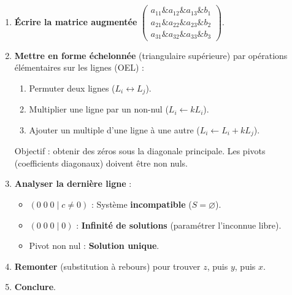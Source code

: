 \documentclass[11pt]{article}
\newcommand{\cle}[1]{{\popxbold\color{popdark}#1}}
\begin{document}
\begin{methode}
\begin{enumerate}
\item \textbf{Écrire la matrice augmentée} $\left( \begin{array}{ccc|c} a_{11} \& a_{12} \& a_{13} \& b_1 \\ a_{21} \& a_{22} \& a_{23} \& b_2 \\ a_{31} \& a_{32} \& a_{33} \& b_3 \end{array} \right)$.
\item \textbf{Mettre en forme échelonnée} (triangulaire supérieure) par \cle{opérations élémentaires sur les lignes (OEL)} :
  \begin{enumerate}
    \item Permuter deux lignes ($L_i \leftrightarrow L_j$).
    \item Multiplier une ligne par un non-nul ($L_i \leftarrow k L_i$).
    \item Ajouter un multiple d'une ligne à une autre ($L_i \leftarrow L_i + k L_j$).
  \end{enumerate}
  Objectif : obtenir des zéros sous la diagonale principale. Les pivots (coefficients diagonaux) doivent être non nuls.
\item \textbf{Analyser la dernière ligne} :
  \begin{itemize}
    \item $(0\;0\;0 \mid c \neq 0)$ : Système \textbf{incompatible} ($S = \varnothing$).
    \item $(0\;0\;0 \mid 0)$ : \textbf{Infinité de solutions} (paramétrer l'inconnue libre).
    \item Pivot non nul : \textbf{Solution unique}.
  \end{itemize}
\item \textbf{Remonter} (substitution à rebours) pour trouver $z$, puis $y$, puis $x$.
\item \textbf{Conclure}.
\end{enumerate}
\end{methode}
\end{document}
